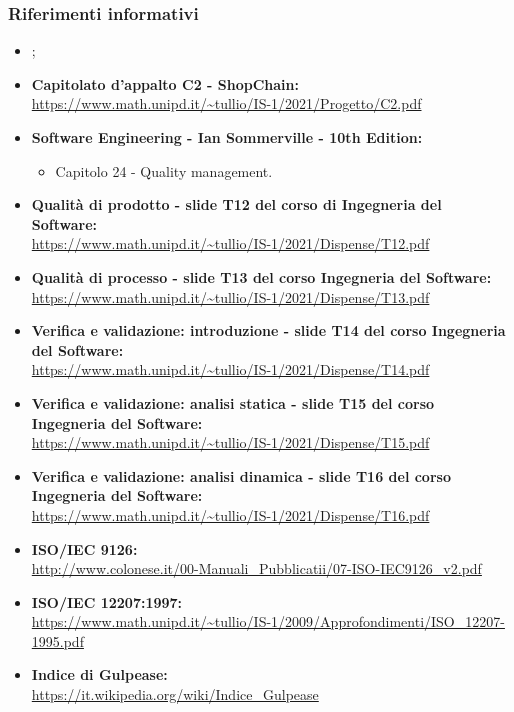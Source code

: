 \subsubsection{Riferimenti informativi}\label{subsubsection:riferimenti_informativi}
\begin{itemize}
  \item \textbf{\docNameVersionAdR{}};
  \item \textbf{Capitolato d'appalto C2 - ShopChain:}\\\url{https://www.math.unipd.it/~tullio/IS-1/2021/Progetto/C2.pdf}
  \item \textbf{Software Engineering - Ian Sommerville - 10th Edition:}
  \begin{itemize}
    \item Capitolo 24 - Quality management.
  \end{itemize}
  \item \textbf{Qualità di prodotto - slide T12 del corso di Ingegneria del Software:}\\\url{https://www.math.unipd.it/~tullio/IS-1/2021/Dispense/T12.pdf}
  \item \textbf{Qualità di processo - slide T13 del corso Ingegneria del Software:}\\\url{https://www.math.unipd.it/~tullio/IS-1/2021/Dispense/T13.pdf}
  \item \textbf{Verifica e validazione: introduzione - slide T14 del corso Ingegneria del Software:}\\\url{https://www.math.unipd.it/~tullio/IS-1/2021/Dispense/T14.pdf}
  \item \textbf{Verifica e validazione: analisi statica - slide T15 del corso Ingegneria del Software:}\\\url{https://www.math.unipd.it/~tullio/IS-1/2021/Dispense/T15.pdf}
  \item \textbf{Verifica e validazione: analisi dinamica - slide T16 del corso Ingegneria del Software:}\\\url{https://www.math.unipd.it/~tullio/IS-1/2021/Dispense/T16.pdf}
  \item \textbf{ISO/IEC 9126:}\\\url{http://www.colonese.it/00-Manuali_Pubblicatii/07-ISO-IEC9126_v2.pdf}
  \item \textbf{ISO/IEC 12207:1997:}\\\url{https://www.math.unipd.it/~tullio/IS-1/2009/Approfondimenti/ISO_12207-1995.pdf}
  \item \textbf{Indice di Gulpease:}\\\url{https://it.wikipedia.org/wiki/Indice_Gulpease}
\end{itemize}